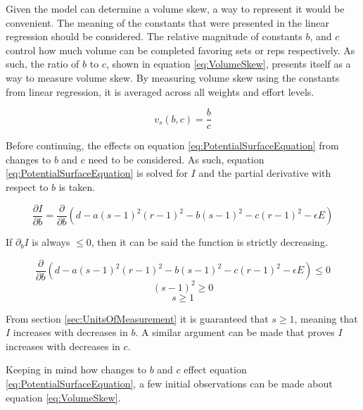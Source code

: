 Given the model can determine a volume skew, a way to represent it would be convenient. The meaning of the constants that were presented in the linear regression should be considered. The relative magnitude of constants $b$, and $c$ control how much volume can be completed favoring sets or reps respectively. As such, the ratio of $b$ to $c$, shown in equation \ref{eq:VolumeSkew}, presents itself as a way to measure volume skew. By measuring volume skew using the constants from linear regression, it is averaged across all weights and effort levels.

\begin{equation}
    \label{eq:VolumeSkew}
    v_s(b,c)=\frac{b}{c}
\end{equation}

Before continuing, the effects on equation \ref{eq:PotentialSurfaceEquation} from changes to $b$ and $c$ need to be considered. As such, equation \ref{eq:PotentialSurfaceEquation} is solved for $I$ and the partial derivative with respect to $b$ is taken. 

\begin{equation}
    \label{eq:VolumeBPartialDerivative}
    \frac{\partial I}{\partial b}=
            \frac{\partial}{\partial b} \left( d-a(s-1)^2(r-1)^2-b(s-1)^2-c(r-1)^2-\epsilon E \right)
\end{equation}

If $\partial_{b}I$ is always $\le 0$, then it can be said the function is strictly decreasing.

\begin{equation*}
    \frac{\partial}{\partial b} \left( d-a(s-1)^2(r-1)^2-b(s-1)^2-c(r-1)^2-\epsilon E \right) \le 0
\end{equation*}
\begin{equation*}
    (s-1)^2 \ge 0
\end{equation*}
\begin{equation*}
    s \ge 1
\end{equation*}

From section \ref{sec:UnitsOfMeasurement} it is guaranteed that $s\ge 1$, meaning that $I$ increases with decreases in $b$. A similar argument can be made that proves $I$ increases with decreases in $c$.

Keeping in mind how changes to $b$ and $c$ effect equation \ref{eq:PotentialSurfaceEquation}, a few initial observations can be made about equation \ref{eq:VolumeSkew}.

